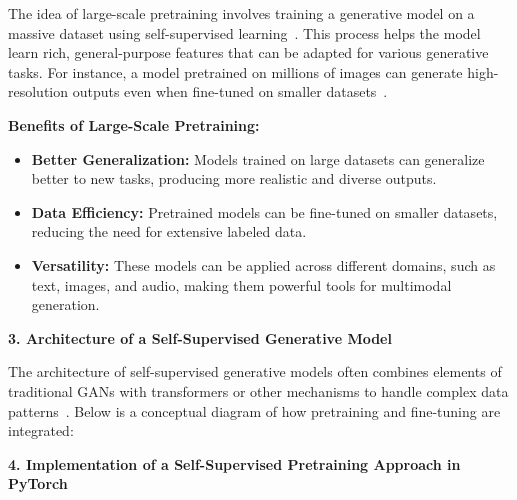 The idea of large-scale pretraining involves training a generative model on a massive dataset using self-supervised learning~\cite{liu2021self}. This process helps the model learn rich, general-purpose features that can be adapted for various generative tasks. For instance, a model pretrained on millions of images can generate high-resolution outputs even when fine-tuned on smaller datasets~\cite{liu2019multi}. 

\textbf{Benefits of Large-Scale Pretraining:}
\begin{itemize}
    \item \textbf{Better Generalization:} Models trained on large datasets can generalize better to new tasks, producing more realistic and diverse outputs.
    \item \textbf{Data Efficiency:} Pretrained models can be fine-tuned on smaller datasets, reducing the need for extensive labeled data.
    \item \textbf{Versatility:} These models can be applied across different domains, such as text, images, and audio, making them powerful tools for multimodal generation.
\end{itemize}

\textbf{3. Architecture of a Self-Supervised Generative Model}

The architecture of self-supervised generative models often combines elements of traditional GANs with transformers or other mechanisms to handle complex data patterns~\cite{liu2021self}. Below is a conceptual diagram of how pretraining and fine-tuning are integrated:

\begin{center}
\end{center}
\textbf{4. Implementation of a Self-Supervised Pretraining Approach in PyTorch}

